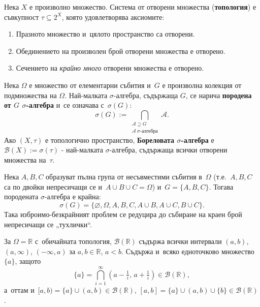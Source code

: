 \begin{defbox}
Нека $X$ е произволно множество. Система от отворени множества
(\textbf{топология}) е съвкупност $\tau \subseteq 2^X$, която
удовлетворява аксиомите:
\begin{enumerate}[label=\arabic*)]
  \item Празното множество и~цялото пространство са отворени.
  \item Обединението на произволен брой отворени множества е отворено.
  \item Сечението на \emph{крайно много} отворени множества е отворено.
\end{enumerate}
\end{defbox}

\begin{defbox}
Нека $\Omega$ е множество от елементарни събития и~$G$ е произволна
колекция от подмножества на $\Omega$. Най-малката $\sigma$-алгебра,
съдържаща $G$, се нарича \textbf{породена от $G$ $\sigma$-алгебра} и~се означава с~$\sigma(G)$:
\[
  \sigma(G) := \bigcap_{\substack{\mathcal{A} \supseteq G\\ \mathcal{A}\ \sigma\text{-алгебра}}} \mathcal{A}.
\]
Ако $(X,\tau)$ е топологично пространство, \textbf{Бореловата
$\sigma$-алгебра} е $\mathcal{B}(X) := \sigma(\tau)$ - най-малката
$\sigma$-алгебра, съдържаща всички отворени множества на~$\tau$.
\end{defbox}

\begin{rembox}
Нека $A,B,C$ образуват пълна група от несъвместими събития в~$\Omega$ (т.е.\ $A,B,C$ са по двойки непресичащи се и~$A\cup B\cup
C=\Omega$) и~$G=\{A,B,C\}$. Тогава породената $\sigma$-алгебра е
крайна:
\[
  \sigma(G) = \{\varnothing,\Omega,A,B,C,A\cup B,A\cup C,B\cup C\}.
\]
Така изброимо-безкрайният проблем се редуцира до събиране на краен
брой непресичащи се „тухлички“.
\end{rembox}

\begin{rembox}
За $\Omega = \mathbb{R}$ с~обичайната топология, $\mathcal{B}(\mathbb{R})$
съдържа всички интервали $(a,b)$, $(a,\infty)$, $(-\infty,a)$ за
$a,b\in\mathbb{R}$, $a<b$. Съдържа и~всяко едноточково множество
$\{a\}$, защото
\[
  \{a\} = \bigcap_{i=1}^{\infty} \left(a-\tfrac1i,\, a+\tfrac1i\right) \in \mathcal{B}(\mathbb{R}),
\]
а~оттам и~$[a,b) = \{a\}\cup(a,b) \in \mathcal{B}(\mathbb{R})$,
$[a,b]=\{a\}\cup(a,b)\cup\{b\}\in\mathcal B(\mathbb R)$.
\end{rembox}
